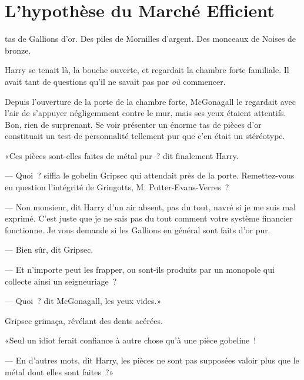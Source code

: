 \chapter[L'hypothèse du Marché Efficient]{L'hypothèse du Marché Efficient\protect\footnotemark}

 tas de Gallions d'or. Des piles de Mornilles d'argent. Des monceaux de Noises de bronze.

\hplettrineextrapara
Harry se tenait là, la bouche ouverte, et regardait la chambre forte familiale. Il avait tant de questions qu'il ne savait pas par \emph{où} commencer.

Depuis l'ouverture de la porte de la chambre forte, McGonagall le regardait avec l'air de s'appuyer négligemment contre le mur, mais ses yeux étaient attentifs. Bon, rien de surprenant. Se voir présenter un énorme tas de pièces d'or constituait un test de personnalité tellement pur que c'en était un stéréotype.

«Ces pièces sont-elles faites de métal pur~? dit finalement Harry.

--- Quoi~? siffla le gobelin Gripsec qui attendait près de la porte. Remettez-vous en question l'intégrité de Gringotts, M. Potter-Evans-Verres~?

--- Non monsieur, dit Harry d'un air absent, pas du tout, navré si je me suis mal exprimé. C'est juste que je ne sais pas du tout comment votre système financier fonctionne. Je vous demande si les Gallions en général sont faits d'or pur.

--- Bien sûr, dit Gripsec.

--- Et n'importe peut les frapper, ou sont-ils produits par un monopole qui collecte ainsi un seigneuriage~?

--- Quoi~? dit McGonagall, les yeux vides.»

Gripsec grimaça, révélant des dents acérées.

«Seul un idiot ferait confiance à autre chose qu'à une pièce gobeline~!

--- En d'autres mots, dit Harry, les pièces ne sont pas supposées valoir plus que le métal dont elles sont faites~?»

